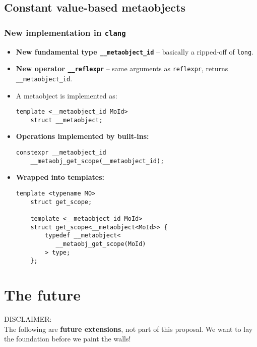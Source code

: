 \documentclass[compress,table,xcolor=table]{beamer}
\begin{document}
\subsection{Constant value-based metaobjects}
\begin{frame}[fragile]
\frametitle{New implementation in \texttt{clang}}
  \large
  \begin{itemize}
    \item \textbf{New fundamental type \texttt{\_\_metaobject\_id}} -- basically
      a ripped-off of \texttt{long}.
    \item \textbf{New operator \texttt{\_\_reflexpr}} -- same arguments as
      \texttt{reflexpr}, returns \texttt{\_\_metaobject\_id}.
    \item A metaobject is implemented as:
    \begin{lstlisting}[basicstyle=\ttfamily\normalsize]
	template <__metaobject_id MoId>
	struct __metaobject;
    \end{lstlisting}
  \end{itemize}
\end{frame}

\begin{frame}[fragile]
  \large
  \begin{itemize}
    \item \textbf{Operations implemented by built-ins:}
    \begin{lstlisting}[basicstyle=\ttfamily\normalsize]
	constexpr __metaobject_id
	__metaobj_get_scope(__metaobject_id);
    \end{lstlisting}
    \item \textbf{Wrapped into templates:}
    \begin{lstlisting}[basicstyle=\ttfamily\normalsize]
	template <typename MO>
	struct get_scope;

	template <__metaobject_id MoId>
	struct get_scope<__metaobject<MoId>> {
	    typedef __metaobject<
	       __metaobj_get_scope(MoId)
	    > type;
	};
    \end{lstlisting}
  \end{itemize}
\end{frame}

\section{The future}

\begin{frame}
\begin{center}
\Huge \alert{DISCLAIMER:}\\
\Large The following are \textbf{future extensions}, not part of this
proposal. We want to lay the foundation before we paint the walls!\\
\normalsize
\end{center}
\end{frame}
\end{document}
